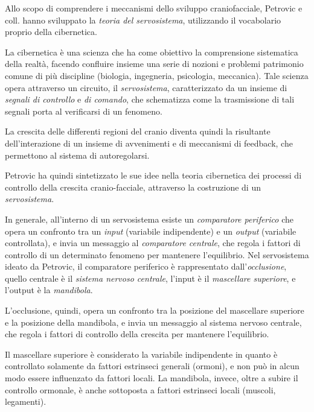 Allo scopo di comprendere i meccanismi dello sviluppo craniofacciale, Petrovic e coll. hanno sviluppato la \textit{teoria del servosistema}, utilizzando il vocabolario proprio della cibernetica.

La cibernetica è una scienza che ha come obiettivo la comprensione sistematica della realtà, facendo confluire insieme una serie di nozioni e problemi patrimonio comune di più discipline (biologia, ingegneria, psicologia, meccanica). Tale scienza opera attraverso un circuito, il \textit{servosistema}, caratterizzato da un insieme di \textit{segnali di controllo} e \textit{di comando}, che schematizza come la trasmissione di tali segnali porta al verificarsi di un fenomeno.

La crescita delle differenti regioni del cranio diventa quindi la risultante dell'in\-te\-ra\-zio\-ne di un insieme di avvenimenti e di meccanismi di feedback, che permettono al sistema di autoregolarsi.

Petrovic ha quindi sintetizzato le sue idee nella teoria cibernetica dei processi di controllo della crescita cranio-facciale, attraverso la costruzione di un \textit{servosistema}.

In generale, all'interno di un servosistema esiste un \textit{comparatore periferico} che opera un confronto tra un \textit{input} (variabile indipendente) e un \textit{output} (variabile controllata), e invia un messaggio al \textit{comparatore centrale}, che regola i fattori di controllo di un determinato fenomeno per mantenere l'equilibrio. Nel servosistema ideato da Petrovic, il comparatore periferico è rappresentato dall'\textit{occlusione}, quello centrale è il \textit{sistema nervoso centrale}, l'input è il \textit{mascellare superiore}, e l'output è la \textit{mandibola}.

L'occlusione, quindi, opera un confronto tra la posizione del mascellare superiore e la posizione della mandibola, e invia un messaggio al sistema nervoso centrale, che regola i fattori di controllo della crescita per mantenere l'equilibrio.

Il mascellare superiore è considerato la variabile indipendente in quanto è controllato solamente da fattori estrinseci generali (ormoni), e non può in alcun modo essere influenzato da fattori locali. La mandibola, invece, oltre a subire il controllo ormonale, è anche sottoposta a fattori estrinseci locali (muscoli, legamenti).
